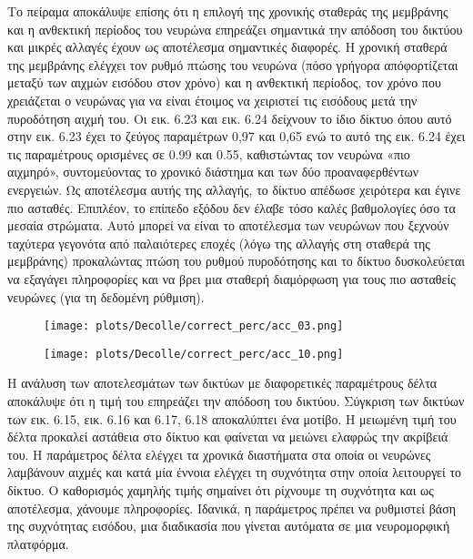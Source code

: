 \documentclass[12pt]{report}
\begin{document}
Το πείραμα αποκάλυψε επίσης ότι η επιλογή της χρονικής σταθεράς της μεμβράνης και η ανθεκτική περίοδος του νευρώνα επηρεάζει σημαντικά την απόδοση του δικτύου και μικρές αλλαγές έχουν ως αποτέλεσμα σημαντικές διαφορές. Η χρονική σταθερά της μεμβράνης ελέγχει τον ρυθμό πτώσης του νευρώνα (πόσο γρήγορα απόφορτίζεται μεταξύ των αιχμών εισόδου στον χρόνο) και η ανθεκτική περίοδος, τον χρόνο που χρειάζεται ο νευρώνας για να είναι έτοιμος να χειριστεί τις εισόδους μετά την πυροδότηση αιχμή του. Οι εικ. 6.23 και εικ. 6.24 δείχνουν το ίδιο δίκτυο όπου αυτό στην εικ. 6.23 έχει το ζεύγος παραμέτρων 0,97 και 0,65 ενώ το αυτό της εικ. 6.24 έχει τις παραμέτρους ορισμένες σε 0.99 και 0.55, καθιστώντας τον νευρώνα «πιο αιχμηρό», συντομεύοντας το χρονικό διάστημα και των δύο προαναφερθέντων ενεργειών. Ως αποτέλεσμα αυτής της αλλαγής, το δίκτυο απέδωσε χειρότερα και έγινε πιο ασταθές. Επιπλέον, το επίπεδο εξόδου δεν έλαβε τόσο καλές βαθμολογίες όσο τα μεσαία στρώματα. Αυτό μπορεί να είναι το αποτέλεσμα των νευρώνων που ξεχνούν ταχύτερα γεγονότα από παλαιότερες εποχές (λόγω της αλλαγής στη σταθερά της μεμβράνης) προκαλώντας πτώση του ρυθμού πυροδότησης και το δίκτυο δυσκολεύεται να εξαγάγει πληροφορίες και να βρει μια σταθερή διαμόρφωση για τους πιο ασταθείς νευρώνες (για τη δεδομένη ρύθμιση).

\begin{figure}
\centering
\begin{minipage}{.4\textwidth}
  \centering
  \texttt{[image: plots/Decolle/correct\_perc/acc\_03.png]}
  \label{fig:test1}
\end{minipage}
\begin{minipage}{.4\textwidth}
  \centering
  \texttt{[image: plots/Decolle/correct\_perc/acc\_10.png]}
  \label{fig:test2}
\end{minipage}
\end{figure}

Η ανάλυση των αποτελεσμάτων των δικτύων με διαφορετικές παραμέτρους δέλτα αποκάλυψε ότι η τιμή του επηρεάζει την απόδοση του δικτύου. Σύγκριση των δικτύων των εικ. 6.15, εικ. 6.16 και 6.17, 6.18 αποκαλύπτει ένα μοτίβο. Η μειωμένη τιμή του δέλτα προκαλεί αστάθεια στο δίκτυο και φαίνεται να μειώνει ελαφρώς την ακρίβειά του. Η παράμετρος δέλτα ελέγχει τα χρονικά διαστήματα στα οποία οι νευρώνες λαμβάνουν αιχμές και κατά μία έννοια ελέγχει τη συχνότητα στην οποία λειτουργεί το δίκτυο. Ο καθορισμός χαμηλής τιμής σημαίνει ότι ρίχνουμε τη συχνότητα και ως αποτέλεσμα, χάνουμε πληροφορίες. Ιδανικά, η παράμετρος πρέπει να ρυθμιστεί βάση της συχνότητας εισόδου, μια διαδικασία που γίνεται αυτόματα σε μια νευρομορφική πλατφόρμα.
\end{document}
